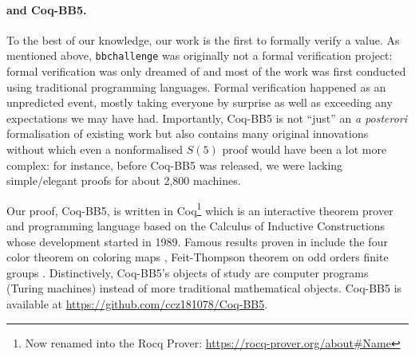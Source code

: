 \documentclass[a4paper,british]{article}
\theoremstyle{definition} %
\numberwithin{equation}{section}
\theoremstyle{definition} %
\newcommand{\ts}[1]{{\color{red}#1}}
\newcommand{\CoqBB}{Coq-BB5\xspace}
\begin{document}


\paragraph{\Coq and \CoqBB.} To the best of our knowledge, our work is the first to formally verify a \BBfull value. As mentioned above, \texttt{bbchallenge} was originally not a formal verification project: formal verification was only dreamed of and most of the work was first conducted using traditional programming languages. Formal verification happened as an unpredicted event, mostly taking everyone by surprise as well as exceeding any expectations we may have had. Importantly, \CoqBB is not ``just'' an \textit{a posterori} formalisation of existing work but also contains many original innovations without which even a nonformalised $S(5)$ proof would have been a lot more complex: for instance, before \CoqBB was released, we were lacking simple/elegant proofs for about 2,800 machines.

Our proof, \CoqBB, is written in Coq\footnote{Now renamed into the Rocq Prover: \url{https://rocq-prover.org/about\#Name}} \cite{the_coq_development_team_2024_14542673} which is an interactive theorem prover and programming language based on the Calculus of Inductive Constructions \cite{CoC} whose development started in 1989. Famous results proven in \Coq include the four color theorem on coloring maps \cite{gonthier2008formal, gonthier2023computer}, Feit-Thompson theorem on odd orders finite groups \cite{gonthier2013machine}. Distinctively, \CoqBB's objects of study are computer programs (Turing machines) instead of more traditional mathematical objects. \CoqBB is available at \url{https://github.com/ccz181078/Coq-BB5}.
\end{document}
